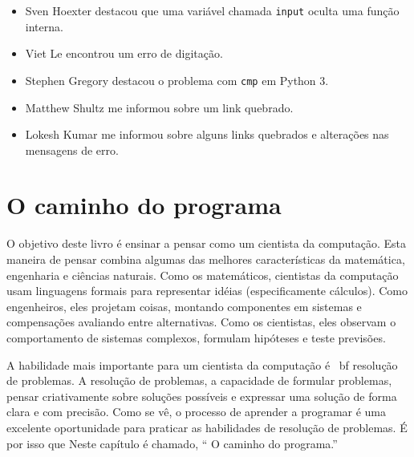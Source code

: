 \documentclass[10pt]{book}
\begin{document}
\begin {itemize}
\item Sven Hoexter destacou que uma variável chamada {\tt input}
oculta uma função interna.

\item Viet Le encontrou um erro de digitação.

\item Stephen Gregory destacou o problema com {\tt cmp}
em Python 3.

\item Matthew Shultz me informou sobre um link quebrado.

\item Lokesh Kumar me informou sobre alguns links quebrados e
alterações nas mensagens de erro.


\end{itemize}

\normalsize
\clearemptydoublepage

\begin{latexonly}

\tableofcontents

\clearemptydoublepage

\end{latexonly}

\mainmatter

\chapter{O caminho do programa}

O objetivo deste livro é ensinar a pensar como um
cientista da computação. Esta maneira de pensar combina algumas das melhores características
da matemática, engenharia e ciências naturais. Como os matemáticos,
cientistas da computação usam linguagens formais para representar idéias (especificamente
cálculos). Como engenheiros, eles projetam coisas, montando componentes
em sistemas e compensações avaliando entre alternativas. Como os cientistas,
eles observam o comportamento de sistemas complexos, formulam hipóteses e teste
previsões.

A habilidade mais importante para um cientista da computação é {\ bf
resolução de problemas}. A resolução de problemas, a capacidade de formular
problemas, pensar criativamente sobre soluções possíveis e expressar uma solução de forma clara
e com precisão. Como se vê, o processo de aprender a programar é uma
excelente oportunidade para praticar as habilidades de resolução de problemas. É por isso que
Neste capítulo é chamado, `` O caminho do programa.''
\end{document}
